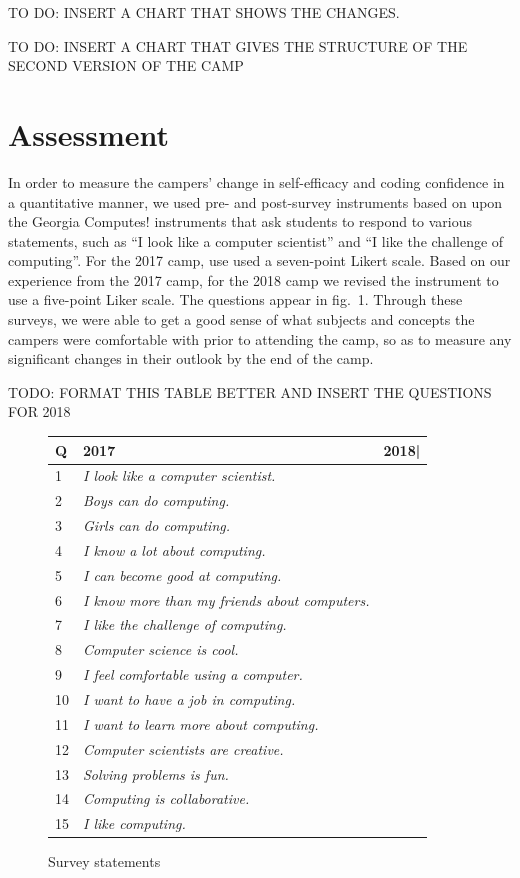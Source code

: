 TO DO: INSERT A CHART THAT SHOWS THE CHANGES.

TO DO: INSERT A CHART THAT GIVES THE STRUCTURE OF THE SECOND VERSION
OF THE CAMP

\section{Assessment}

In order to measure the campers' change in self-efficacy and coding
confidence in a quantitative manner, we used pre- and post-survey
instruments based on upon the Georgia Computes! instruments
\cite{Bruckman2009} that ask students to respond to various statements,
such as ``I look like a computer scientist'' and ``I like the
challenge of computing''.  For the 2017 camp, use used  a seven-point Likert 
scale.  Based on our experience from the 2017 camp, for the 2018 camp
we revised the instrument to use a five-point Liker scale.
The questions
appear in fig.~1.  Through these surveys, we were able to get a
good sense of what subjects and concepts the campers were comfortable
with prior to attending the camp, so as to measure any significant
changes in their outlook by the end of the camp.  

TODO: FORMAT THIS TABLE BETTER AND INSERT THE QUESTIONS FOR 2018

\begin{figure}
{\small
\begin{tabular}{l|l|l}
\textbf{Q} & \textbf{2017} & \textbf{2018}| \\ \hline
 1 & \textit{I look like a computer scientist.} \\
 2 & \textit{Boys can do computing.} \\
 3 & \textit{Girls can do computing.} \\
 4 & \textit{I know a lot about computing.} \\
 5 & \textit{I can become good at computing.} \\
 6 & \textit{I know more than my friends about computers.} \\
 7 & \textit{I like the challenge of computing.} \\
 8 & \textit{Computer science is cool.} \\
 9 & \textit{I feel comfortable using a computer.} \\
10 & \textit{I want to have a job in computing.} \\
11 & \textit{I want to learn more about computing.} \\
12 & \textit{Computer scientists are creative.} \\
13 & \textit{Solving problems is fun.} \\
14 & \textit{Computing is collaborative.} \\
15 & \textit{I like computing.} 
\end{tabular}
}
\caption{Survey statements}
\end{figure}

